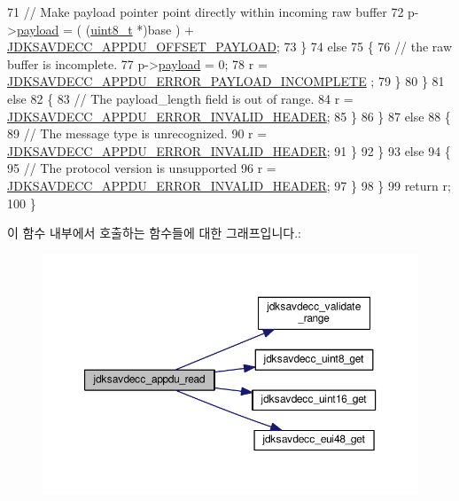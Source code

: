 \begin{DoxyCode}
71                         \textcolor{comment}{// Make payload pointer point directly within incoming raw buffer}
72                         p->\hyperlink{structjdksavdecc__appdu_aa5cbdad2c57e9b3f949e1a4d96382b66}{payload} = ( (\hyperlink{stdint_8h_aba7bc1797add20fe3efdf37ced1182c5}{uint8\_t} *)base ) + 
      \hyperlink{group__appdu__offset_ga8ac1754da7222c1b936a70a384b3a89d}{JDKSAVDECC\_APPDU\_OFFSET\_PAYLOAD};
73                     \}
74                     \textcolor{keywordflow}{else}
75                     \{
76                         \textcolor{comment}{// the raw buffer is incomplete.}
77                         p->\hyperlink{structjdksavdecc__appdu_aa5cbdad2c57e9b3f949e1a4d96382b66}{payload} = 0;
78                         r = \hyperlink{group__appdu__errors_gabe3e811ac0be333fe56dd1082062913c}{JDKSAVDECC\_APPDU\_ERROR\_PAYLOAD\_INCOMPLETE}
      ;
79                     \}
80                 \}
81                 \textcolor{keywordflow}{else}
82                 \{
83                     \textcolor{comment}{// The payload\_length field is out of range.}
84                     r = \hyperlink{group__appdu__errors_gab87365f108c8b06ef41b56adaf53ec2d}{JDKSAVDECC\_APPDU\_ERROR\_INVALID\_HEADER};
85                 \}
86             \}
87             \textcolor{keywordflow}{else}
88             \{
89                 \textcolor{comment}{// The message type is unrecognized.}
90                 r = \hyperlink{group__appdu__errors_gab87365f108c8b06ef41b56adaf53ec2d}{JDKSAVDECC\_APPDU\_ERROR\_INVALID\_HEADER};
91             \}
92         \}
93         \textcolor{keywordflow}{else}
94         \{
95             \textcolor{comment}{// The protocol version is unsupported}
96             r = \hyperlink{group__appdu__errors_gab87365f108c8b06ef41b56adaf53ec2d}{JDKSAVDECC\_APPDU\_ERROR\_INVALID\_HEADER};
97         \}
98     \}
99     \textcolor{keywordflow}{return} r;
100 \}
\end{DoxyCode}


이 함수 내부에서 호출하는 함수들에 대한 그래프입니다.\+:
\nopagebreak
\begin{figure}[H]
\begin{center}
\leavevmode
\includegraphics[width=350pt]{group__app_gaa7c23b8cb57a079768c0f19d290cf543_cgraph}
\end{center}
\end{figure}




